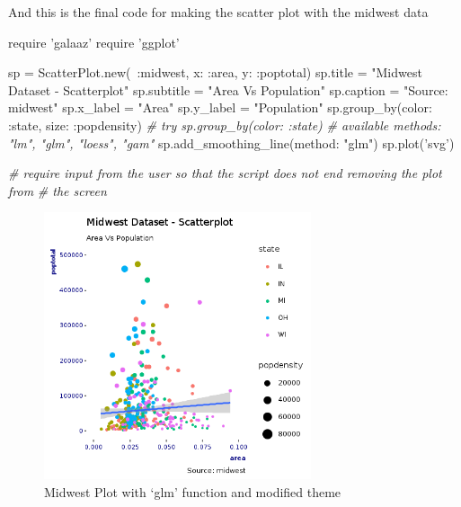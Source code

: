 \documentclass[11pt,]{article}
\newenvironment{Shaded}{\begin{snugshade}}{\end{snugshade}}
\newcommand{\DataTypeTok}[1]{\textcolor[rgb]{0.13,0.29,0.53}{#1}}
\newcommand{\StringTok}[1]{\textcolor[rgb]{0.31,0.60,0.02}{#1}}
\newcommand{\CommentTok}[1]{\textcolor[rgb]{0.56,0.35,0.01}{\textit{#1}}}
\newcommand{\NormalTok}[1]{#1}
\begin{document}
And this is the final code for making the scatter plot with the midwest
data

\begin{Shaded}
\begin{Highlighting}[]
\NormalTok{require }\StringTok{'galaaz'}
\NormalTok{require }\StringTok{'ggplot'}

\NormalTok{sp = }\DataTypeTok{ScatterPlot}\NormalTok{.new(~}\StringTok{:midwest}\NormalTok{, }\StringTok{x: :area}\NormalTok{, }\StringTok{y: :poptotal}\NormalTok{)}
\NormalTok{sp.title = }\StringTok{"Midwest Dataset - Scatterplot"}
\NormalTok{sp.subtitle = }\StringTok{"Area Vs Population"}
\NormalTok{sp.caption = }\StringTok{"Source: midwest"}
\NormalTok{sp.x_label = }\StringTok{"Area"}
\NormalTok{sp.y_label = }\StringTok{"Population"}
\NormalTok{sp.group_by(}\StringTok{color: :state}\NormalTok{, }\StringTok{size: :popdensity}\NormalTok{)    }\CommentTok{# try sp.group_by(color: :state)}
\CommentTok{# available methods: "lm", "glm", "loess", "gam"}
\NormalTok{sp.add_smoothing_line(}\StringTok{method: "glm"}\NormalTok{) }
\NormalTok{sp.plot(}\StringTok{'svg'}\NormalTok{)}

\CommentTok{# require input from the user so that the script does not end removing the plot from}
\CommentTok{# the screen}
\end{Highlighting}
\end{Shaded}

\begin{figure}
\centering
\includegraphics[width=0.70000\textwidth]{scatter_plot.png}
\caption{Midwest Plot with `glm' function and modified theme}
\end{figure}
\end{document}
